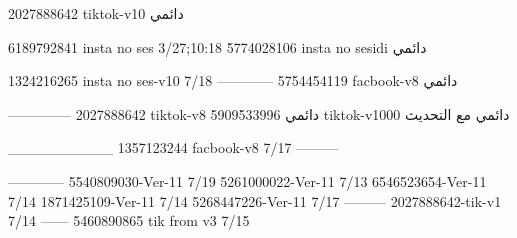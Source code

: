 2027888642 tiktok-v10
دائمي

6189792841 insta no ses
3/27;10:18
5774028106 insta no sesidi
دائمي

1324216265 insta no ses-v10
7/18
------------
5754454119 facbook-v8
دائمي


--------------
2027888642 tiktok-v8
دائمي
5909533996 tiktok-v1000
دائمي مع التحديث

__________
1357123244 facbook-v8
7/17
---------

------------
5540809030-Ver-11
7/19
5261000022-Ver-11
7/13
6546523654-Ver-11
7/14
1871425109-Ver-11
7/14
5268447226-Ver-11
7/17
---------
2027888642-tik-v1
7/14
------
5460890865 tik from v3
7/15
